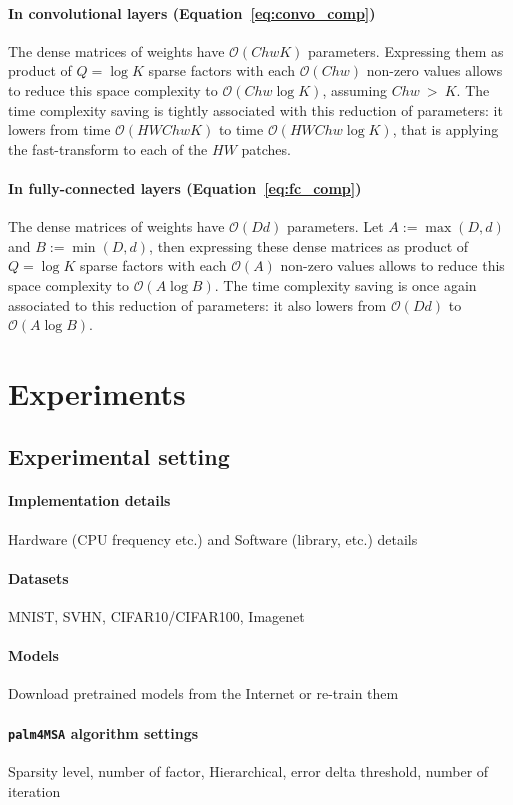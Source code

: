 \documentclass[12pt]{article}
\def\palm{\texttt{palm4MSA}\xspace}
\newcommand{\bigO}[1]{\mathcal{O}\left(#1\right)}
\begin{document}
\paragraph{In convolutional layers (Equation~\eqref{eq:convo_comp})} The dense matrices of weights have $\bigO{ChwK}$ parameters. Expressing them as product of $Q = \log K$ sparse factors with each $\bigO{Chw}$ non-zero values allows to reduce this space complexity to $\bigO{Chw \log K}$, assuming $Chw~>~K$. The time complexity saving is tightly associated with this reduction of parameters: it lowers from time $\bigO{HWChwK}$ to time $\bigO{HWChw \log K}$, that is applying the fast-transform to each of the $HW$ patches.

\paragraph{In fully-connected layers (Equation~\ref{eq:fc_comp})} The dense matrices of weights have $\bigO{Dd}$ parameters. Let $A:=\max(D, d)$ and $B:=\min(D, d)$, then expressing these dense matrices as product of  $Q = \log K$ sparse factors with each $\bigO{A}$ non-zero values allows to reduce this space complexity to $\bigO{A \log B}$. The time complexity saving is once again associated to this reduction of parameters: it also lowers from $\bigO{Dd}$ to $\bigO{A \log B}$.

\section{Experiments}
\label{sec:experiments}

\subsection{Experimental setting}
\paragraph{Implementation details} Hardware (CPU frequency etc.) and Software (library, etc.) details
\paragraph{Datasets} MNIST, SVHN, CIFAR10/CIFAR100, Imagenet
\paragraph{Models} Download pretrained models from the Internet or re-train them
\paragraph{\palm algorithm settings} Sparsity level, number of factor, Hierarchical, error delta threshold, number of iteration
\end{document}
